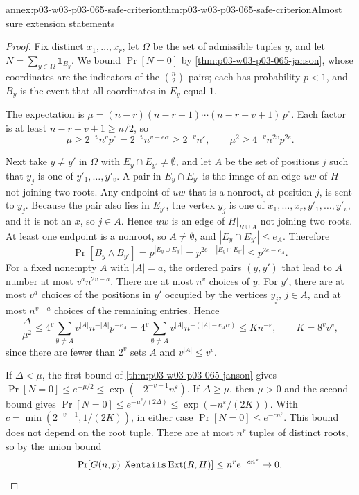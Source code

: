\begin{annexitem}{annex:p03-w03-p03-065-safe-criterion}{thm:p03-w03-p03-065-safe-criterion}{Almost sure extension statements}
\begin{proof}
Fix distinct \(x_1,\ldots,x_r\), let \(\Omega\) be the set of admissible
tuples \(y\), and let \(N=\sum_{y\in\Omega}\mathbf 1_{B_y}\).  We bound
\(\Pr[N=0]\) by \cref{thm:p03-w03-p03-065-janson}, whose coordinates are
the indicators of the \(\binom n2\) pairs; each has probability \(p<1\), and
\(B_y\) is the event that all coordinates in \(E_y\) equal \(1\).

The expectation is \(\mu=(n-r)(n-r-1)\cdots(n-r-v+1)\,p^e\).  Each factor is
at least \(n-r-v+1\geq n/2\), so
\[
  \mu\geq2^{-v}n^vp^e=2^{-v}n^{v-e\alpha}\geq2^{-v}n^{\varepsilon},
  \qquad
  \mu^2\geq4^{-v}n^{2v}p^{2e}.
\]

Next take \(y\neq y'\) in \(\Omega\) with \(E_y\cap E_{y'}\neq\emptyset\),
and let \(A\) be the set of positions \(j\) such that \(y_j\) is one of
\(y'_1,\ldots,y'_v\).  A pair in \(E_y\cap E_{y'}\) is the image of an edge
\(uw\) of \(H\) not joining two roots.  Any endpoint of \(uw\) that is a
nonroot, at position \(j\), is sent to \(y_j\).  Because the pair also lies
in \(E_{y'}\), the vertex \(y_j\) is one of
\(x_1,\ldots,x_r,y'_1,\ldots,y'_v\), and it is not an \(x\), so \(j\in A\).
Hence \(uw\) is an edge of \(H|_{R\cup A}\) not joining two roots.  At least
one endpoint is a nonroot, so \(A\neq\emptyset\), and
\(|E_y\cap E_{y'}|\leq e_A\).  Therefore
\[
  \Pr[B_y\wedge B_{y'}]=p^{|E_y\cup E_{y'}|}
  =p^{2e-|E_y\cap E_{y'}|}\leq p^{2e-e_A}.
\]
For a fixed nonempty \(A\) with \(|A|=a\), the ordered pairs \((y,y')\) that
lead to \(A\) number at most \(v^an^{2v-a}\).  There are at most \(n^v\)
choices of \(y\).  For \(y'\), there are at most \(v^a\) choices of the
positions in \(y'\) occupied by the vertices \(y_j\), \(j\in A\), and at
most \(n^{v-a}\) choices of the remaining entries.  Hence
\[
  \frac\Delta{\mu^2}
  \leq4^v\sum_{\emptyset\neq A}v^{|A|}n^{-|A|}p^{-e_A}
  =4^v\sum_{\emptyset\neq A}v^{|A|}n^{-(|A|-e_A\alpha)}
  \leq Kn^{-\varepsilon},
  \qquad K=8^vv^v ,
\]
since there are fewer than \(2^v\) sets \(A\) and \(v^{|A|}\leq v^v\).

If \(\Delta<\mu\), the first bound of \cref{thm:p03-w03-p03-065-janson}
gives \(\Pr[N=0]\leq e^{-\mu/2}\leq\exp(-2^{-v-1}n^{\varepsilon})\).  If
\(\Delta\geq\mu\), then \(\mu>0\) and the second bound gives
\(\Pr[N=0]\leq e^{-\mu^2/(2\Delta)}\leq\exp(-n^{\varepsilon}/(2K))\).  With
\(c=\min(2^{-v-1},1/(2K))\), in either case \(\Pr[N=0]\leq
e^{-cn^{\varepsilon}}\).  This bound does not depend on the root tuple.
There are at most \(n^r\) tuples of distinct roots, so by the union bound
\[
  \Pr[G(n,p)\not\entails\operatorname{Ext}(R,H)]\leq n^re^{-cn^{\varepsilon}}
  \to0 .
\]
\end{proof}
\end{annexitem}

